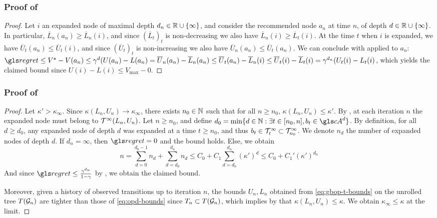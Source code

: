 \subsubsection{Proof of }
\label{sec:proof-recommendation-bound}
\begin{proof}
	Let $i$ an expanded node of maximal depth $d_n\in\mathbb{R}\cup\{\infty\}$, and consider the recommended node $a_n$ at time $n$, of depth $d\in\mathbb{R}\cup\{\infty\}$. In particular, $\overline{L}_n(a_n) \geq \overline{L}_n(i)$, and since $(\overline{L}_t)_t$ is non-decreasing we also have $\overline{L}_n(i) \geq \overline{L}_t(i)$. At the time $t$ when $i$ is expanded, we have $\overline{U}_t(a_n) \leq \overline{U}_t(i)$, and since $(\overline{U}_t)_t$ is non-increasing we also have $\overline{U}_n(a_n) \leq \overline{U}_t(a_n)$. We can conclude with  applied to $a_n$: $\regret \leq V^\star - V(a_n) \leq  \gamma^d(U(a_n)-L(a_n) = \overline{U}_n(a_n) - \overline{L}_n(a_n)  \leq \overline{U}_t(a_n) - \overline{L}_n(i) \leq \overline{U}_t(i) - \overline{L}_t(i) = \gamma^{d_n}(U_t(i) - L_t(i)$, which yields the claimed bound since $U(i) - L(i) \leq V_{\max}-0$.
\end{proof}


\subsubsection{Proof of }
\label{sec:proof-regret-gbop}
\begin{proof}
Let $\kappa'>\kappa_\infty$. Since $\kappa(L_n,U_n)\rightarrow\kappa_\infty$, there exists $n_0\in\mathbb{N}$ such that for all $n\geq n_0$, $\kappa(L_n,U_n) \leq \kappa'$.
By , at each iteration $n$ the expanded node must belong to $\mathcal{T}^\infty(L_n,U_n)$.
Let $n\geq n_0$, and define $d_0 = \min\{d\in\Natural: \exists t \in[n_0,n], b_t\in \cA^d \}$. By definition, for all $d\geq d_0$, any expanded node of depth $d$ was expanded at a time $t\geq n_0$, and thus $b_t\in\mathcal{T}^\infty_t \subset\mathcal{T}^\infty_{n_0}$. We denote $n_d$ the number of expanded nodes of depth $d$. If $d_n=\infty$, then $\regret = 0$ and the bound holds. Else, we obtain
\[
n = \sum_{d=0}^{d_0-1}n_d + \sum_{d=d_0}^{d_n} n_d \leq  C_0 + C_1\sum_{d=d_0}^{d_n} (\kappa')^d \leq C_0 + C_1' (\kappa')^{d_n}
\]
And since $\regret \leq \frac{\gamma^{d_n}}{1-\gamma}$ by , we obtain the claimed bound.

Moreover, given a history of observed transitions up to iteration $n$, the bounds $U_n, L_n$ obtained from \eqref{eq:gbop-t-bounds} on the unrolled tree $T(\mathcal{G}_n)$ are tighter than those of \eqref{eq:opd-bounds} since $T_n\subset T(\mathcal{G}_n)$, which implies by  that $\kappa(L_n, U_n) \leq \kappa$. We obtain $\kappa_\infty \leq \kappa$ at the limit. 
\end{proof}

